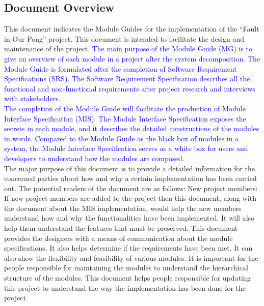 \documentclass[12pt,letterpaper]{article}
\begin{document}
	\subsection{Document Overview}
	\indent This document indicates the Module Guides for the implementation of the “Fault in Our Pong” project. This document is intended to facilitate the design and maintenance of the project. \textcolor{blue}{The main purpose of the Module Guide (MG) is to give an overview of each module in a project after the system decomposition. The Module Guide is formulated after the completion of Software Requirement Specifications (SRS). The Software Requirement Specification describes all the functional and non-functional requirements after project research and interviews with stakeholders.}\\
\textcolor{blue}{The completion of the Module Guide will facilitate the production of Module Interface Specification (MIS). The Module Interface Specification exposes the secrets in each module, and it describes the detailed constructions of the modules in words. Compared to the Module Guide as the black box of modules in a system, the Module Interface Specification serves as a white box for users and developers to understand how the modules are composed. }\\
	The major purpose of this document is to provide a detailed information for the concerned parties about how and why a certain implementation has been carried out. The potential readers of the document are as follows:
New project members: If new project members are added to the project then this document, along with the document about the MIS implementation, would help the new members understand how and why the functionalities have been implemented. It will also help them understand the features that must be preserved.
	This document provides the designers with a means of communication about the module specifications. It also helps determine if the requirements have been met. It can also show the flexibility and feasibility of various modules. 
	It is important for the people responsible for maintaining the modules to understand the hierarchical structure of the modules. This document helps people responsible for updating this project to understand the way the implementation has been done for the project.
\end{document}
